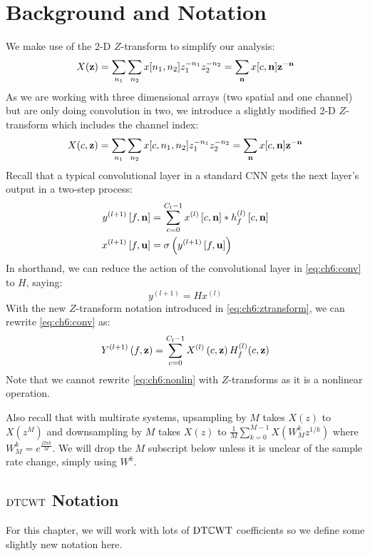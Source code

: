 \section{Background and Notation}
We make use of the 2-D $Z$-transform to simplify our analysis:
%
\begin{equation}
  X(\mathbf{z}) = \sum_{n_1}\sum_{n_2} x[n_1, n_2]z_1^{-n_1}z_2^{-n_2} =
  \sum_{\mathbf{n}}x[c, \mathbf{n}]\mathbf{z}^{-\mathbf{n}}
\end{equation}
%
As we are working with three dimensional arrays (two spatial and one channel) but are
only doing convolution in two, we introduce a slightly modified 2-D $Z$-transform
which includes the channel index:
%
\begin{equation}
  X(c, \mathbf{z}) = \sum_{n_1}\sum_{n_2} x[c, n_1, n_2]z_1^{-n_1}z_2^{-n_2} =
  \sum_{\mathbf{n}}x[c, \mathbf{n}]\mathbf{z}^{-\mathbf{n}} \label{eq:ch6:ztransform}
\end{equation}
%
Recall that a typical convolutional
layer in a standard CNN gets the next layer's output in a two-step process:
%
\begin{align} 
  y^{(l+1)}\left[f, \mathbf{n}\right] &= \sum_{c=0}^{C_l - 1} x^{(l)}\left[c, \mathbf{n}\right] \ast h^{(l)}_{f}\left[c, \mathbf{n} \right]
    \label{eq:ch6:conv}\\
    x^{(l+1)}\left[f, \mathbf{u}\right] & =  \sigma \left( y^{(l+1)}\left[f, \mathbf{u}\right] \right) \label{eq:ch6:nonlin}
\end{align}
%
In shorthand, we can reduce the action of the convolutional layer in \eqref{eq:ch6:conv} to $H$, saying:
\begin{equation}
  y^{(l+1)} = Hx^{(l)}
\end{equation}
%
With the new $Z$-transform notation introduced in \eqref{eq:ch6:ztransform}, we
can rewrite \eqref{eq:ch6:conv} as:
%
\begin{equation}
  Y^{(l+1)}\left(f, \mathbf{z}\right) = \sum_{c=0}^{C_l - 1} X^{(l)}\left(c, \mathbf{z}\right) H_f^{(l)}(c, \mathbf{z})
\end{equation}
%
Note that we cannot rewrite \eqref{eq:ch6:nonlin} with $Z$-transforms as it is a nonlinear
operation.

Also recall that with multirate systems, upsampling by $M$ takes $X(z)$ to
$X(z^M)$ and downsampling by $M$ takes $X(z)$ to $\frac{1}{M}\sum_{k=0}^{M-1} X(W_M^k
z^{1/k})$ where $W_M^k = e^{\frac{j2\pi k}{M}}$. We will drop the $M$ subscript
below unless it is unclear of the sample rate change, simply using $W^k$.

\subsection{$\mathrm{DT}\mathbb{C}\mathrm{WT}$ Notation}
For this chapter, we will work with lots of $\mathrm{DT}\mathbb{C}\mathrm{WT}$ coefficients so we define
some slightly new notation here.


